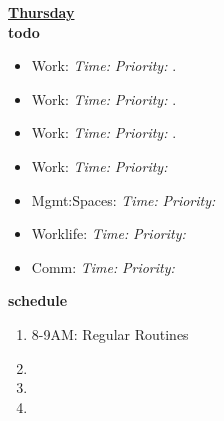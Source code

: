 \documentclass[11pt]{article}
\newcommand{\timeEst}[1]{\textit{Time:} \textit{#1}}
\newcommand{\priority}[1]{\textit{Priority:} \textit{#1}}
\newcommand{\deadline}[1]{#1}
\begin{document}
{            \textbf{\small \underline{Thursday}} \\
            \textbf{\small todo} \\
            \begin{itemize} 
              \tiny \item \tiny Work:                                      \deadline{} \timeEst{} \priority{}. 
            \item \tiny Work:                                              \deadline{ }   \timeEst{}  \priority{}.
            \item \tiny Work:                                              \deadline{ }   \timeEst{}  \priority{}. 
            \item \tiny Work:                                              \deadline{} \timeEst{} \priority{} 
            \item \tiny Mgmt:Spaces:                                       \deadline{} \timeEst{} \priority{} 
            \item \tiny Worklife:                                          \deadline{} \timeEst{} \priority{} 
            \item \tiny Comm:                                              \deadline{} \timeEst{} \priority{} 
            \end{itemize} 
            \textbf{\small schedule} \\
            \begin{enumerate}
              \tiny \item \tiny 8-9AM: Regular Routines 
            \item \tiny 
            \item \tiny 
            \item \tiny   
            \end{enumerate} 
            
}
\end{document}
